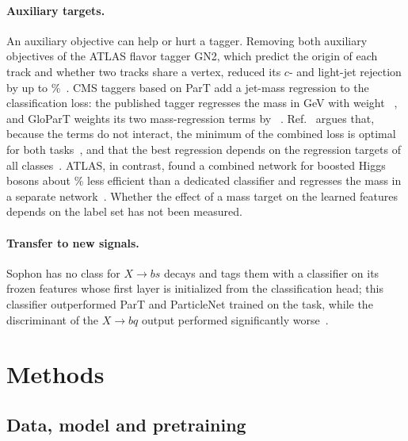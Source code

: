 \documentclass[11pt]{article}
\begin{document}
\paragraph{Auxiliary targets.} An auxiliary objective can help or hurt a tagger. Removing both
auxiliary objectives of the ATLAS flavor tagger GN2, which predict the origin of each track and
whether two tracks share a vertex, reduced its $c$- and light-jet rejection by up to
\LitGnTwoAuxRejectionDropPercent\%~\cite[Discussion]{gntwo}. CMS taggers based on ParT add a
jet-mass regression to the classification loss: the published tagger regresses the mass in GeV with
weight \LitCmsPartMassLambda~\cite{cmspart}, and GloParT weights its two mass-regression terms by
\LitGlopartMassLambda~\cite[Eq.~(11.7)]{glopart}. Ref.~\cite{glopart} argues that, because the
terms do not interact, the minimum of the combined loss is optimal for both
tasks~\cite[Sec.~11.2.1]{glopart}, and that the best regression depends on the regression targets of
all classes~\cite[Sec.~11.3.2]{glopart}. ATLAS, in contrast, found a combined network for boosted
Higgs bosons about \LitAtlasUnifiedEffDropPercent\% less efficient than a dedicated classifier and
regresses the mass in a separate network~\cite[Sec.~6.5]{atlasgnx}. Whether the effect of a mass
target on the learned features depends on the label set has not been measured.

\paragraph{Transfer to new signals.} Sophon has no class for $X\to bs$ decays and tags them with a
classifier on its frozen features whose first layer is initialized from the classification head;
this classifier outperformed ParT and ParticleNet trained on the task, while the discriminant of
the $X\to bq$ output performed significantly worse~\cite[Sec.~III]{sophon}.

\section{Methods}\label{sec:methods}



\subsection{Data, model and pretraining}\label{sec:design}
\end{document}
